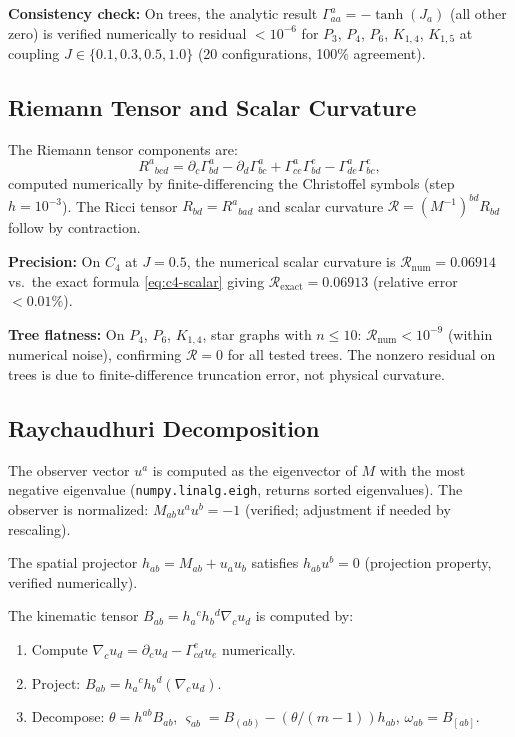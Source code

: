 \documentclass[11pt]{article}
\theoremstyle{definition}
\theoremstyle{remark}
\newcommand{\Met}{M}
\newcommand{\obs}{u}
\newcommand{\vort}{\omega}
\newcommand{\Chr}[2]{\Gamma^{#1}_{#2}}
\newcommand{\Ric}{R}
\newcommand{\Scal}{\mathcal{R}}
\newcommand{\expan}{\theta}
\newcommand{\shear}{\varsigma} %
\begin{document}
\textbf{Consistency check:} On trees, the analytic result
$\Chr{a}{aa} = -\tanh(J_a)$ (all other zero) is verified numerically
to residual $< 10^{-6}$ for $P_3$, $P_4$, $P_6$, $K_{1,4}$, $K_{1,5}$
at coupling $J \in \{0.1, 0.3, 0.5, 1.0\}$ (20 configurations, 100\%
agreement).

\subsection{Riemann Tensor and Scalar Curvature}

The Riemann tensor components are:
\begin{equation}
  \Ric^a{}_{bcd} = \partial_c \Chr{a}{bd} - \partial_d \Chr{a}{bc}
    + \Chr{a}{ce}\Chr{e}{bd} - \Chr{a}{de}\Chr{e}{bc},
\end{equation}
computed numerically by finite-differencing the Christoffel symbols
(step $h = 10^{-3}$). The Ricci tensor $\Ric_{bd} = \Ric^a{}_{bad}$
and scalar curvature $\Scal = (\Met^{-1})^{bd}\Ric_{bd}$ follow by
contraction.

\textbf{Precision:} On $C_4$ at $J = 0.5$, the numerical scalar
curvature is $\Scal_{\mathrm{num}} = 0.06914$ vs.\ the exact formula
\eqref{eq:c4-scalar} giving $\Scal_{\mathrm{exact}} = 0.06913$
(relative error $< 0.01\%$).

\textbf{Tree flatness:} On $P_4$, $P_6$, $K_{1,4}$, star graphs with
$n \leq 10$: $\Scal_{\mathrm{num}} < 10^{-9}$ (within numerical noise),
confirming $\Scal = 0$ for all tested trees. The nonzero residual on
trees is due to finite-difference truncation error, not physical curvature.

\subsection{Raychaudhuri Decomposition}

The observer vector $\obs^a$ is computed as the eigenvector of $\Met$
with the most negative eigenvalue (\texttt{numpy.linalg.eigh}, returns
sorted eigenvalues). The observer is normalized: $\Met_{ab}\obs^a\obs^b
= -1$ (verified; adjustment if needed by rescaling).

The spatial projector $h_{ab} = \Met_{ab} + \obs_a \obs_b$ satisfies
$h_{ab}\obs^b = 0$ (projection property, verified numerically).

The kinematic tensor $B_{ab} = h_a{}^c h_b{}^d \nabla_c \obs_d$ is
computed by:
\begin{enumerate}
\item Compute $\nabla_c \obs_d = \partial_c \obs_d - \Chr{e}{cd}\obs_e$
  numerically.
\item Project: $B_{ab} = h_a{}^c h_b{}^d (\nabla_c \obs_d)$.
\item Decompose: $\expan = h^{ab} B_{ab}$,
  $\shear_{ab} = B_{(ab)} - (\expan/(m-1)) h_{ab}$,
  $\vort_{ab} = B_{[ab]}$.
\end{enumerate}
\end{document}

